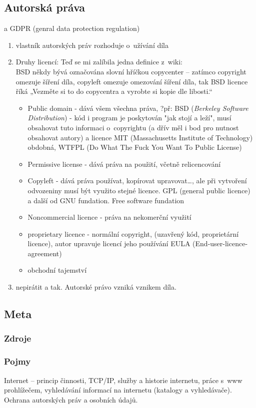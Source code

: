 \documentclass[12pt]{article}
\begin{document}
\subsection{Autorská práva}
a  GDPR (genral data protection regulation)
\begin{enumerate}
\item vlastník autorských práv rozhoduje o~užívání díla
\item Druhy licencí:
Teď se mi zalíbila jedna definice z~wiki:\\
BSD někdy bývá označována slovní hříčkou copycenter – zatímco copyright omezuje šíření díla, copyleft omezuje omezování šíření díla, tak BSD licence říká „Vezměte si to do copycentra a vyrobte si kopie dle libosti.“
\begin{itemize}
\item Public domain - dává všem všechna práva, ?př: BSD (\emph{Berkeley Software Distribution}) - kód i program  je poskytován "jak stojí a leží", musí obsahovat tuto informaci o~copyrightu (a dřív měl i bod pro nutnost obsahovat autory) a licence MIT (Massachusetts Institute of Technology) obdobná, WTFPL (Do What The Fuck You Want To Public License)
\item Permissive license - dává práva na použití, včetně relicencování 
\item Copyleft - dává práva používat, kopírovat upravovat\dots, ale při vytvoření odvozeniny musí být využito stejné licence. GPL  (general public licence) a další od GNU fundation. Free software fundation
\item Noncommercial licence - práva na nekomerční využití
\item proprietary licence - normální copyright, (uzavřený kód, proprietární licence), autor upravuje licencí jeho používání EULA (End-user-licence-agreement)
\item obchodní tajemství
\end{itemize}
\item nepirátit a tak. Autorské právo vzniká vznikem díla.	
\end{enumerate}
\subsection{Meta}
\subsubsection{Zdroje}
\subsubsection{Pojmy}
Internet – princip činnosti, TCP/IP, služby a historie internetu, práce s~www prohlížečem, vyhledávání informací na internetu (katalogy a vyhledávače). Ochrana autorských práv a osobních údajů. 
\end{document}
